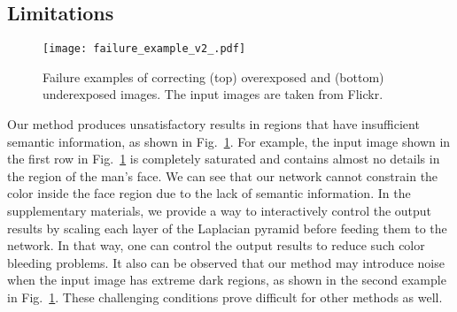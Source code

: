 \documentclass[final]{cvpr}
\begin{document}
\subsection{Limitations}\label{subsec:limitations}
\begin{figure}[b]
\centering
\texttt{[image: failure\_example\_v2\_.pdf]}
\vspace{-6mm}
\caption{Failure examples of correcting (top) overexposed and (bottom) underexposed images. The input images are taken from Flickr.\vspace{-2mm}} 
\label{fig:failureExamples}
\end{figure}



Our method produces unsatisfactory results in regions that have insufficient semantic information, as shown in Fig.~\ref{fig:failureExamples}. For example, the input image shown in the first row in Fig.\ \ref{fig:failureExamples} is completely saturated and contains almost no details in the region of the man's face. We can see that our network cannot constrain the color inside the face region due to the lack of semantic information. In the supplementary materials, we provide a way to interactively control the output results by scaling each layer of the Laplacian pyramid before feeding them to the network. In that way, one can control the output results to reduce such color bleeding problems. It also can be observed that our method may introduce noise when the input image has extreme dark regions, as shown in the second example in Fig.\ \ref{fig:failureExamples}. These challenging conditions prove difficult for other methods as well. 
\end{document}
